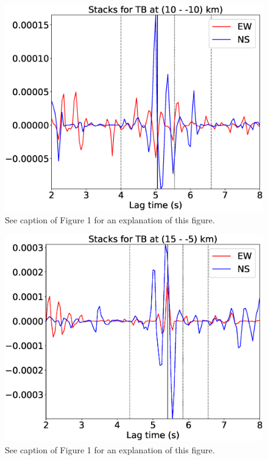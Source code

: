 \documentclass[letterpaper, 12pt]{article}
\begin{document}
\begin{figure}[H]
\includegraphics[width=\linewidth]{figures/intervals/TB_010_-10_stacks.eps}
\caption{See caption of Figure 1 for an explanation of this figure.}
\end{figure}

\begin{figure}[H]
\includegraphics[width=\linewidth]{figures/intervals/TB_015_-05_stacks.eps}
\caption{See caption of Figure 1 for an explanation of this figure.}
\end{figure}
\end{document}

